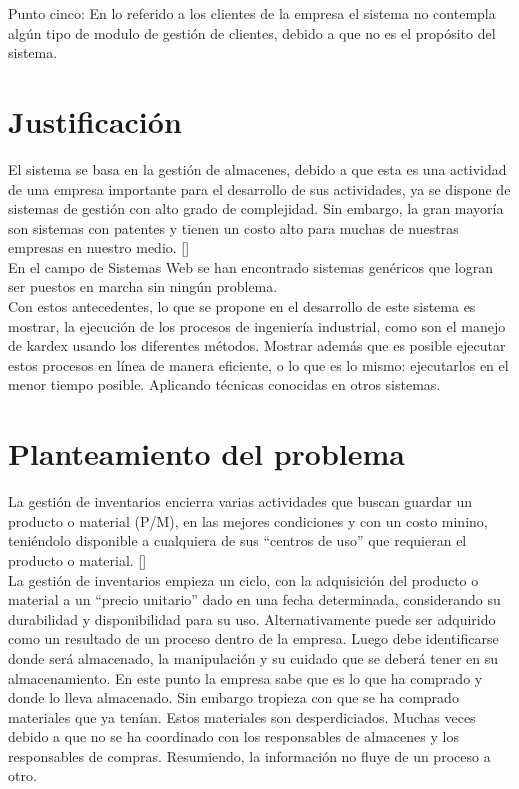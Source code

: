 Punto cinco: En  lo referido a los clientes de la empresa el sistema no contempla algún tipo de modulo de gestión de clientes, debido a que no es el propósito del sistema.\\

\section{Justificación}

El sistema se basa en la gestión de almacenes, debido a que esta es una actividad de una empresa importante para el desarrollo de sus actividades, ya se dispone de sistemas de gestión con alto grado de complejidad. Sin embargo, la gran mayoría son sistemas con patentes y tienen un costo alto para muchas de nuestras empresas en nuestro medio. [\citet{UDL:2019:Online}]\\

En el campo de Sistemas Web se han encontrado sistemas genéricos que logran ser puestos en marcha sin ningún problema.\\

Con estos antecedentes, lo que se propone en el desarrollo de este sistema es mostrar, la ejecución de los procesos de ingeniería industrial, como son el manejo de kardex usando los diferentes métodos. Mostrar además que es posible ejecutar estos procesos en línea de manera eficiente, o lo que es lo mismo: ejecutarlos en el menor tiempo posible. Aplicando técnicas conocidas en otros sistemas.\\


\section{Planteamiento del problema}

La gestión de inventarios encierra varias actividades que buscan guardar un producto o material (P/M), en las mejores condiciones y con un costo minino, teniéndolo disponible a cualquiera de sus “centros de uso” que requieran el producto o material. [\citet{PMA:2019:Online}]\\

La gestión de inventarios empieza un ciclo, con la adquisición del producto o material a un “precio unitario” dado en una fecha determinada, considerando su durabilidad y disponibilidad para su uso. Alternativamente puede ser adquirido como un resultado de un proceso dentro de la empresa. Luego debe identificarse donde será almacenado, la manipulación y su cuidado que se deberá tener en su almacenamiento. En este punto la empresa sabe que es lo que ha comprado y donde lo lleva almacenado. Sin embargo tropieza con que se ha comprado materiales que ya tenían. Estos materiales son desperdiciados. Muchas veces debido a que no se ha coordinado con los responsables de almacenes y los responsables de compras. Resumiendo, la información no fluye de un proceso a otro.\\

